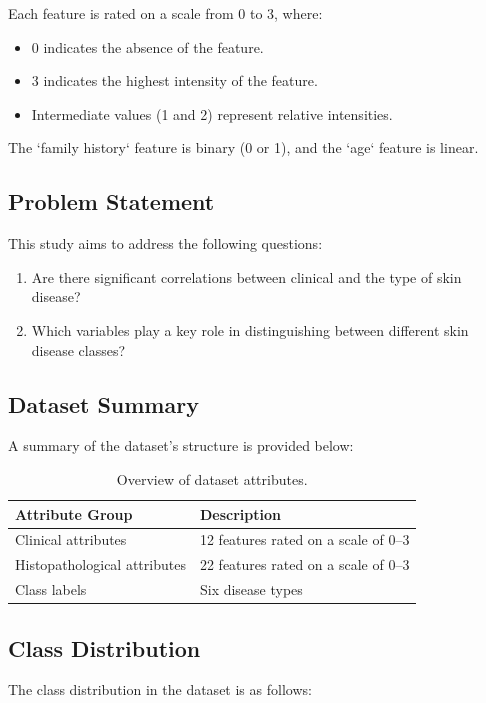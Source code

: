 \documentclass[a4paper,12pt]{article}
\begin{document}
Each feature is rated on a scale from 0 to 3, where:
\begin{itemize}
    \item 0 indicates the absence of the feature.
    \item 3 indicates the highest intensity of the feature.
    \item Intermediate values (1 and 2) represent relative intensities.
\end{itemize}
The `family history` feature is binary (0 or 1), and the `age` feature is linear.

\subsection{Problem Statement}
This study aims to address the following questions:
\begin{enumerate}
    \item Are there significant correlations between clinical and the type of skin disease?
    \item Which variables play a key role in distinguishing between different skin disease classes?
\end{enumerate}

\subsection{Dataset Summary}
A summary of the dataset's structure is provided below:

\begin{table}[h!]
\centering
\begin{tabular}{ll}
\toprule
\textbf{Attribute Group}       & \textbf{Description} \\
\midrule
Clinical attributes            & 12 features rated on a scale of 0--3 \\
Histopathological attributes   & 22 features rated on a scale of 0--3 \\
Class labels                   & Six disease types \\
\bottomrule
\end{tabular}
\caption{Overview of dataset attributes.}
\end{table}

\subsection{Class Distribution}
The class distribution in the dataset is as follows:
\end{document}
